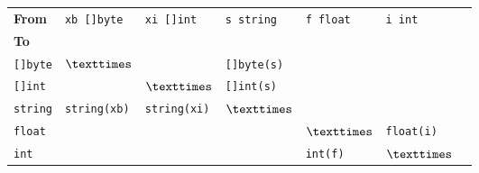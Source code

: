 \begin{tabular}{lllllll}
\textbf{From}	 &  \verb|xb []byte|& \verb|xi []int|& \verb|s string|     & \verb|f float|	&  \verb|i int|	\\ \cmidrule(r){1-6}
\textbf{To}	 &		    &		     &			   &			& \\ \cmidrule(r){1-1}
\verb|[]byte|    & $\texttimes$	    &		     & \verb|[]byte(s)|	   &			& \\
\verb|[]int|     &		    & $\texttimes$   & \verb|[]int(s)|	   &			& \\
\verb|string|    &\verb|string(xb)| &\verb|string(xi)|&	$\texttimes$	   &			& \\
\verb|float|	 &		    &		     &			   & $\texttimes$	& \verb|float(i)|\\
\verb|int|	 &		    &		     &			   & \verb|int(f)|	& $\texttimes$ \\
\end{tabular}
